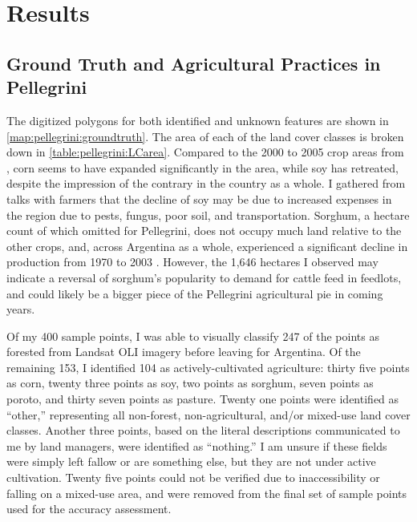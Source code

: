 \chapter{Results}
\label{chapter:results}

\section{Ground Truth and Agricultural Practices in Pellegrini}

The digitized polygons for both identified and unknown features are shown in \autoref{map:pellegrini:groundtruth}. The area of each of the land cover classes is broken down in \autoref{table:pellegrini:LCarea}. Compared to the 2000 to 2005 crop areas from \textcite{volante2005analisis}, corn seems to have expanded significantly in the area, while soy has retreated, despite the impression of the contrary in the country as a whole. I gathered from talks with farmers that the decline of soy may be due to increased expenses in the region due to pests, fungus, poor soil, and transportation. Sorghum, a hectare count of which \citeauthor{volante2005analisis} omitted for Pellegrini, does not occupy much land relative to the other crops, and, across Argentina as a whole, experienced a significant decline in production from 1970 to 2003 \autocite{paruelo2005expansion}. However, the 1,646 hectares I observed may indicate a reversal of sorghum's popularity to demand for cattle feed in feedlots, and could likely be a bigger piece of the Pellegrini agricultural pie in coming years.

Of my 400 sample points, I was able to visually classify 247 of the points as forested from Landsat OLI imagery before leaving for Argentina. Of the remaining 153, I identified 104 as actively-cultivated agriculture: thirty five points as corn, twenty three points as soy, two points as sorghum, seven points as poroto, and thirty seven points as pasture. Twenty one points were identified as ``other,'' representing all non-forest, non-agricultural, and/or mixed-use land cover classes. Another three points, based on the literal descriptions communicated to me by land managers, were identified as ``nothing.'' I am unsure if these fields were simply left fallow or are something else, but they are not under active cultivation. Twenty five points could not be verified due to inaccessibility or falling on a mixed-use area, and were removed from the final set of sample points used for the accuracy assessment.

